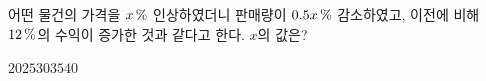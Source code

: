 어떤 물건의 가격을 $x\mkern3mu \%$ 인상하였더니 판매량이 $0.5x\mkern3mu \%$ 감소하였고, 이전에 비해 $12\mkern3mu \%$의 수익이 증가한 것과 같다고 한다. $x$의 값은? 
\begin{choices32}{$20$}{$25$}{$30$}{$35$}{$40$}\end{choices32}
